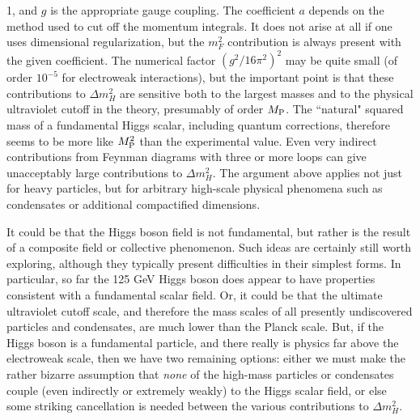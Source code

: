 \documentclass[12pt]{article}
\def\MPlanck{M_{\rm P}}
\begin{document}
1, and $g$ is the appropriate gauge coupling. The coefficient $a$ depends 
on the method used to cut off the momentum integrals. It does not arise at 
all if one uses dimensional regularization, but the $m_F^2$ contribution 
is always present with the given coefficient. The numerical factor 
$(g^2/16 \pi^2)^2$ may be quite small (of order $10^{-5}$ for electroweak 
interactions), but the important point is that these contributions to 
$\Delta m_H^2$ are sensitive both to the largest masses and to the 
physical ultraviolet cutoff in the theory, presumably of order $\MPlanck$. The 
``natural" squared mass of a fundamental Higgs scalar, including quantum 
corrections, therefore seems to be more like $\MPlanck^2$ than the 
experimental value. Even very indirect contributions from 
Feynman diagrams with three or more loops can give unacceptably large 
contributions to $\Delta m_H^2$. The argument above applies not just for 
heavy particles, but for arbitrary high-scale physical phenomena such as 
condensates or additional compactified dimensions.

It could be that the Higgs boson field is not fundamental, but rather is the result of
a composite field or collective phenomenon. Such ideas are certainly still worth
exploring, although they typically present difficulties in their simplest
forms. In particular, so far the 125 GeV Higgs boson does appear to have properties
consistent with a fundamental scalar field. Or, it could be that the ultimate 
ultraviolet cutoff scale, and therefore the mass scales of all presently undiscovered particles and condensates, are much lower than the Planck scale. 
But, if the Higgs boson is a fundamental particle, and there really
is physics far above the electroweak scale, then we have two remaining
options: either we must make the rather bizarre assumption that {\it none} of the
high-mass particles or condensates couple (even
indirectly or extremely weakly) to the Higgs scalar field, or else some
striking cancellation is needed between the various contributions to
$\Delta m_H^2$. 
\end{document}
